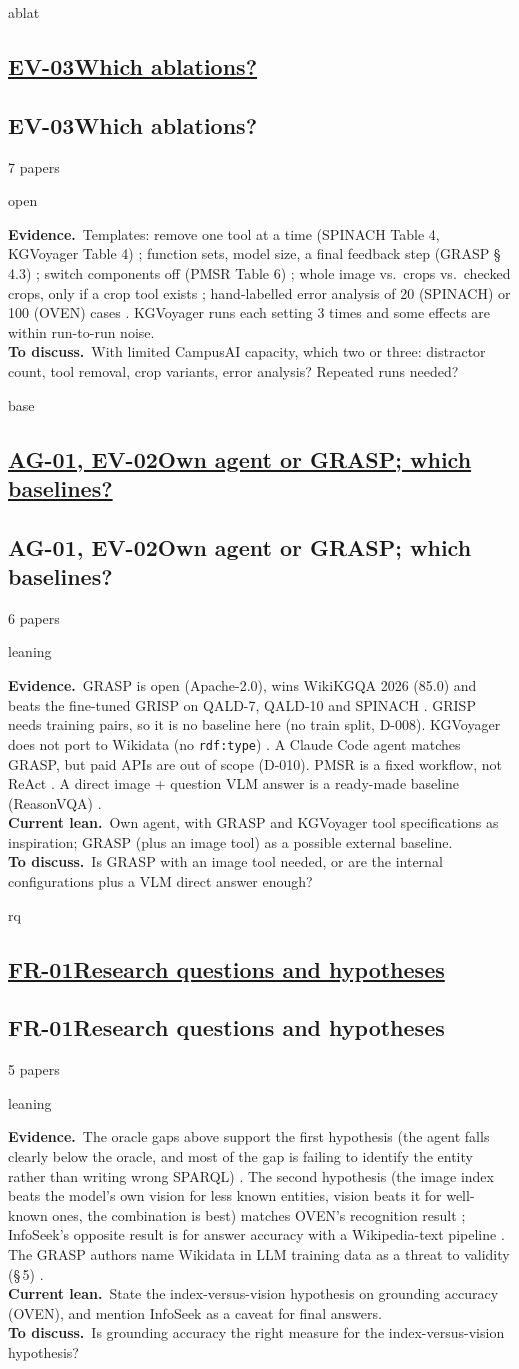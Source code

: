 \documentclass[10pt,a4paper]{article}
\newcommand{\st}[2]{\colorbox{#1}{\footnotesize\strut #2}}
\newcommand{\leaning}{\st{yellow!35}{leaning}}
\newcommand{\open}{\st{red!15}{open}}
\newcommand{\qblock}[1][]{\def\qkey{#1}\qblockx}
\newcommand{\qblockx}[4]{%
  \ifx\qkey\empty
  \subsection*{\underline{#1\quad #2}}%
  \else\hypertarget{\qkey}{}
  \subsection*{#1\quad #2}\fi%
{\footnotesize #3 papers\quad}#4\par}
\newcommand{\ev}{\textbf{Evidence.}}
\newcommand{\lean}{\textbf{Current lean.}}
\newcommand{\ask}{\textbf{To discuss.}}
\begin{document}
\qblock[ablat]{EV-03}{Which ablations?}{7}{\open}
\ev\ Templates: remove one tool at a time (SPINACH Table 4, KGVoyager
Table 4) \cite{liu2024spinach,wisam2026kgvoyager}; function sets, model
size, a final feedback step (GRASP \S\,4.3) \cite{walter2025grasp}; switch
components off (PMSR Table 6) \cite{choi2025progressive}; whole image vs.\
crops vs.\ checked crops, only if a crop tool exists
\cite{jian2024large,shen2026sage}; hand-labelled error analysis of 20
(SPINACH) or 100 (OVEN) cases \cite{hu2023open}. KGVoyager runs each setting
3 times and some effects are within run-to-run noise.\\
\ask\ With limited CampusAI capacity, which two or three: distractor
count, tool removal, crop variants, error analysis? Repeated runs needed?

\qblock[base]{AG-01, EV-02}{Own agent or GRASP; which baselines?}{6}{\leaning}
\ev\ GRASP is open (Apache-2.0), wins WikiKGQA 2026 (85.0) and beats the
fine-tuned GRISP on QALD-7, QALD-10 and SPINACH
\cite{walter2025grasp,walter2026grasp,walter2026grisp}. GRISP needs
training pairs, so it is no baseline here (no train split, D-008).
KGVoyager does not port to Wikidata (no \texttt{rdf:type})
\cite{wisam2026kgvoyager}. A Claude Code agent matches GRASP, but paid APIs
are out of scope (D-010). PMSR is a fixed workflow, not ReAct
\cite{choi2025progressive}. A direct image + question VLM answer is a
ready-made baseline (ReasonVQA) \cite{tran2025reasonvqa}.\\
\lean\ Own agent, with GRASP and KGVoyager tool specifications as
inspiration; GRASP (plus an image tool) as a possible external baseline.\\
\ask\ Is GRASP with an image tool needed, or are the internal
configurations plus a VLM direct answer enough?

\qblock[rq]{FR-01}{Research questions and hypotheses}{5}{\leaning}
\ev\ The oracle gaps above support the first hypothesis (the agent
  falls clearly below the oracle,
  and most of the gap is failing to identify the entity rather than writing
wrong SPARQL) \cite{loustaunau2025qawiki,ma2026m3}. The second hypothesis
(the image index beats the model's own vision for less known entities, vision
beats it for well-known ones, the combination is best) matches OVEN's
recognition result
\cite{hu2023open}; InfoSeek's opposite result is for answer accuracy with a
Wikipedia-text pipeline \cite{chen2023can}. The GRASP authors name Wikidata
in LLM training data as a threat to validity (\S\,5) \cite{walter2026grasp}.\\
\lean\ State the index-versus-vision hypothesis on grounding accuracy
(OVEN), and mention InfoSeek as a
caveat for final answers.\\
\ask\ Is grounding accuracy the right measure for the
index-versus-vision hypothesis?
\end{document}
